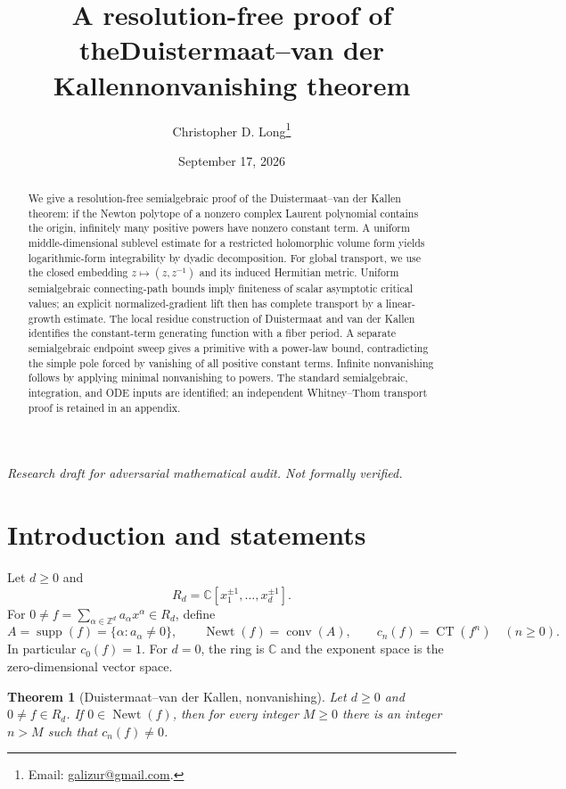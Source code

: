 \documentclass[11pt]{article}
\title{A resolution-free proof of the\newline Duistermaat--van der Kallen\newline nonvanishing theorem}
\author{Christopher D. Long\thanks{Email: \href{mailto:galizur@gmail.com}{galizur@gmail.com}.}}
\date{September 17, 2026}
\numberwithin{equation}{section}
\newtheorem{theorem}{Theorem}[section]
\theoremstyle{definition}
\theoremstyle{remark}
\newcommand{\C}{\mathbb C}
\newcommand{\Z}{\mathbb Z}
\newcommand{\CT}{\operatorname{CT}}
\newcommand{\Newt}{\operatorname{Newt}}
\newcommand{\supp}{\operatorname{supp}}
\newcommand{\conv}{\operatorname{conv}}
\begin{document}
\maketitle
\begin{center}
\small\textit{Research draft for adversarial mathematical audit. Not formally verified.}
\end{center}
\begin{abstract}
We give a resolution-free semialgebraic proof of the Duistermaat--van der
Kallen theorem: if the Newton polytope of a nonzero complex Laurent
polynomial contains the origin, infinitely many positive powers have
nonzero constant term. A uniform middle-dimensional sublevel estimate
for a restricted holomorphic volume form yields logarithmic-form
integrability by dyadic decomposition. For global transport, we use the
closed embedding $z\mapsto(z,z^{-1})$ and its induced Hermitian metric.
Uniform semialgebraic connecting-path bounds imply finiteness of scalar
asymptotic critical values; an explicit normalized-gradient lift then
has complete transport by a linear-growth estimate. The local residue
construction of Duistermaat and van der Kallen identifies the constant-term
generating function with a fiber period. A separate semialgebraic endpoint
sweep gives a primitive with a power-law bound, contradicting the simple
pole forced by vanishing of all positive constant terms. Infinite
nonvanishing follows by applying minimal nonvanishing to powers.
The standard semialgebraic, integration, and ODE inputs are identified;
an independent Whitney--Thom transport proof is retained in an appendix.
\end{abstract}

\section{Introduction and statements}\label{sec:introduction}
Let $d\ge0$ and
\[
 R_d=\C[x_1^{\pm1},\ldots,x_d^{\pm1}].
\]
For $0\ne f=\sum_{\alpha\in\Z^d}a_\alpha x^\alpha\in R_d$, define
\[
 A=\supp(f)=\{\alpha:a_\alpha\ne0\},\qquad
 \Newt(f)=\conv(A),\qquad
 c_n(f)=\CT(f^n)\quad(n\ge0).
\]
In particular $c_0(f)=1$. For $d=0$, the ring is $\C$ and the exponent
space is the zero-dimensional vector space.

\begin{theorem}[Duistermaat--van der Kallen, nonvanishing]\label{thm:main}
Let $d\ge0$ and $0\ne f\in R_d$. If $0\in\Newt(f)$, then for every
integer $M\ge0$ there is an integer $n>M$ such that $c_n(f)\ne0$.
\end{theorem}
\end{document}
